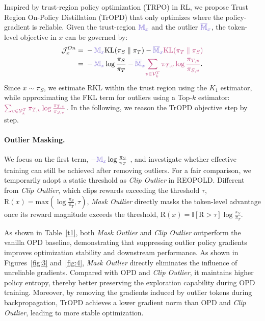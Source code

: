 \documentclass{article} %
\begin{document}
Inspired by trust-region policy optimization (TRPO) in RL, we propose Trust Region On-Policy Distillation (TrOPD) that only optimizes where the policy-gradient is reliable. 
Given the trust-region $\color{maskpurple}\mathbb{M}_{x}$ and the outlier $\color{maskpurple}\overline{\mathbb{M}}_{x}$, the token-level objective in $x$ can be governed by:
\begin{equation}
\begin{aligned}
\mathcal{J}_{x}^{On}
={}&
-{\color{maskpurple}\mathbb{M}_{x}}
    \mathrm{KL}(\pi_S \parallel \pi_T)
-{\color{maskpurple}\overline{\mathbb{M}}_{x}}
    {\color{reversemagenta}
    \mathrm{KL}(\pi_T \parallel \pi_S)}
\\
={}&
-{\color{maskpurple}\mathbb{M}_{x}}
    \log \frac{\pi_S}{\pi_T}
-{\color{maskpurple}\overline{\mathbb{M}}_{x}}
    {\color{reversemagenta}
    \sum_{v \in \mathcal{V}^{T}_{k}}
    \pi_{T,v}
    \log \frac{\pi_{T,v}}{\pi_{S,v}}
    } .
\end{aligned}
\end{equation}
Since $x \sim \pi_S$, we estimate RKL within the trust region using the $K_1$ estimator, while approximating the FKL term for outliers using a Top-$k$ estimator:
$
{\color{reversemagenta}
\sum_{v \in \mathcal{V}^{T}_{k}}
\pi_{T,v}
\log \frac{\pi_{T,v}}{\pi_{S,v}}
}$.
In the following, we reason the TrOPD objective step by step.












\paragraph{Outlier Masking.} 
We focus on the first term, 
$-{\color{maskpurple}\mathbb{M}_{x}}\log \frac{\pi_S}{\pi_T}$
, and investigate whether effective training can still be achieved after removing outliers. For a fair comparison, we temporarily adopt a static threshold as \textit{Clip Outlier} in REOPOLD. Different from \textit{Clip Outlier}, which clips rewards exceeding the threshold $\tau$, $\mathrm{R}(x)=\mathrm{max}(\log \frac{\pi_S}{\pi_T},\tau)$, \textit{Mask Outlier} directly masks the token-level advantage once its reward magnitude exceeds the threshold, $\mathrm{R}(x)=\mathbb{I}[\mathrm{R}>\tau]\log \frac{\pi_S}{\pi_T}$.

As shown in Table~\ref{t1}, both \textit{Mask Outlier} and \textit{Clip Outlier} outperform the vanilla OPD baseline, demonstrating that suppressing outlier policy gradients improves optimization stability and downstream performance. 
As shown in Figures~\ref{fig:3} and~\ref{fig:4}, \textit{Mask Outlier} directly eliminates the influence of unreliable gradients. Compared with OPD and \textit{Clip Outlier}, it maintains higher policy entropy, thereby better preserving the exploration capability during OPD training. Moreover, by removing the gradients induced by outlier tokens during backpropagation, TrOPD achieves a lower gradient norm than OPD and \textit{Clip Outlier}, leading to more stable optimization.
\end{document}
